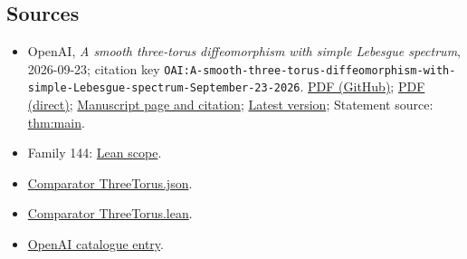 \documentclass[11pt]{article}
\begin{document}
\subsection{Sources}
\begin{itemize}
\item OpenAI, \emph{A smooth three-torus diffeomorphism with simple Lebesgue spectrum}, 2026-09-23; citation key \texttt{OAI:A-smooth-three-torus-diffeomorphism-with-simple-Lebesgue-spectrum-September-23-2026}. \href{https://github.com/openai/math/blob/adc7f1241b42e322a6451854ab7e4b4c146bf78a/preprints/A-smooth-three-torus-diffeomorphism-with-simple-Lebesgue-spectrum-September-23-2026/paper.pdf}{PDF (GitHub)}; \href{https://github.com/openai/math/raw/adc7f1241b42e322a6451854ab7e4b4c146bf78a/preprints/A-smooth-three-torus-diffeomorphism-with-simple-Lebesgue-spectrum-September-23-2026/paper.pdf}{PDF (direct)}; \href{https://github.com/openai/math/blob/adc7f1241b42e322a6451854ab7e4b4c146bf78a/preprints/A-smooth-three-torus-diffeomorphism-with-simple-Lebesgue-spectrum-September-23-2026/README.md}{Manuscript page and citation}; \href{https://github.com/openai/math/blob/main/preprints/A-smooth-three-torus-diffeomorphism-with-simple-Lebesgue-spectrum-September-23-2026/paper.pdf}{Latest version}; Statement source: \href{https://github.com/openai/math/blob/adc7f1241b42e322a6451854ab7e4b4c146bf78a/preprints/A-smooth-three-torus-diffeomorphism-with-simple-Lebesgue-spectrum-September-23-2026/build/sections/01-introduction.tex\#L18}{thm:main}.
\item Family 144: \href{https://github.com/openai/math/blob/adc7f1241b42e322a6451854ab7e4b4c146bf78a/lean/docs/144.md}{Lean scope}.
\item \href{https://github.com/openai/math/blob/adc7f1241b42e322a6451854ab7e4b4c146bf78a/lean/ComparatorChallenges/ThreeTorus.json}{Comparator ThreeTorus.json}.
\item \href{https://github.com/openai/math/blob/adc7f1241b42e322a6451854ab7e4b4c146bf78a/lean/ComparatorChallenges/ThreeTorus.lean}{Comparator ThreeTorus.lean}.
\item \href{https://github.com/openai/math/blob/adc7f1241b42e322a6451854ab7e4b4c146bf78a/CONTENTS.md}{OpenAI catalogue entry}.
\end{itemize}
\end{document}
